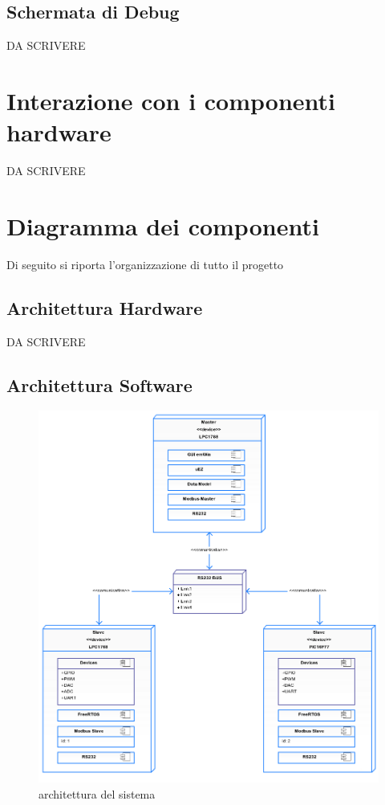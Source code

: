 \documentclass[a4paper,titlepage]{book}
\begin{document}
\subsection{Schermata di Debug}
DA SCRIVERE

\section{Interazione con i componenti hardware}
DA SCRIVERE

\section{Diagramma dei componenti}

Di seguito si riporta l'organizzazione di tutto il progetto

\subsection{Architettura Hardware}
DA SCRIVERE

\subsection{Architettura Software}
\begin{figure}[!h]
\centering
\includegraphics[scale=0.3]{deploy.png}
\caption{architettura del sistema}\label{fig:1}



\end{figure}
\end{document}
